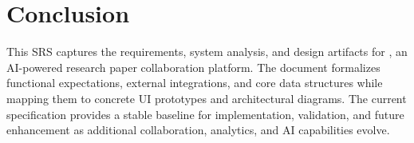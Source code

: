 \chapter{Conclusion}
\label{ch:srs-conclusion}

This SRS captures the requirements, system analysis, and design artifacts for \projectname{}, an AI-powered research paper collaboration platform. The document formalizes functional expectations, external integrations, and core data structures while mapping them to concrete UI prototypes and architectural diagrams. The current specification provides a stable baseline for implementation, validation, and future enhancement as additional collaboration, analytics, and AI capabilities evolve.
